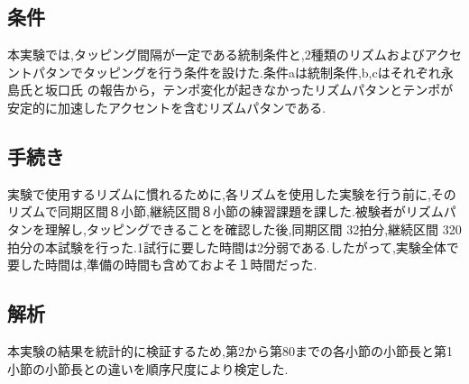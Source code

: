 \documentclass[12pt]{jarticle}
\begin{document}
\subsection{条件}
本実験では,タッピング間隔が一定である統制条件と,2種類のリズムおよびアクセントパタンでタッピングを行う条件を設けた.条件aは統制条件,b,cはそれぞれ永島氏と坂口氏 \cite{Nagasima}の報告から，テンポ変化が起きなかったリズムパタンとテンポが安定的に加速したアクセントを含むリズムパタンである.

\subsection{手続き}
実験で使用するリズムに慣れるために,各リズムを使用した実験を行う前に,そのリズムで同期区間８小節,継続区間８小節の練習課題を課した.被験者がリズムパタンを理解し,タッピングできることを確認した後,同期区間 32拍分,継続区間 320拍分の本試験を行った.1試行に要した時間は2分弱である.したがって,実験全体で要した時間は,準備の時間も含めておよそ１時間だった.

\subsection{解析}
本実験の結果を統計的に検証するため,第2から第80までの各小節の小節長と第1小節の小節長との違いを順序尺度により検定した.



\end{document}

